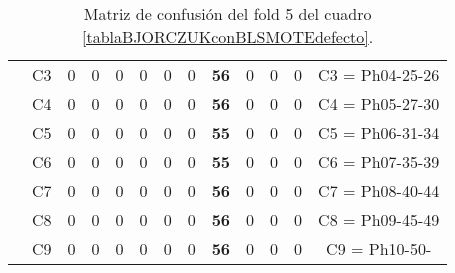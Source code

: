 \begin{table}[H]
{\begin{tabular}{|ccrrrrrrrrrrc|}
\multicolumn{1}{|c|}{}                                      & \multicolumn{1}{c|}{C3} & \multicolumn{1}{c|}{0}  & \multicolumn{1}{c|}{0}  & \multicolumn{1}{c|}{0}  & \multicolumn{1}{c|}{0}  & \multicolumn{1}{c|}{0}  & \multicolumn{1}{c|}{0}  & \multicolumn{1}{c|}{\textbf{56}} & \multicolumn{1}{c|}{0}  & \multicolumn{1}{c|}{0}  & \multicolumn{1}{c|}{0}  & C3 = Ph04-25-26   \\ \cline{2-13}
\multicolumn{1}{|c|}{}                                      & \multicolumn{1}{c|}{C4} & \multicolumn{1}{c|}{0}  & \multicolumn{1}{c|}{0}  & \multicolumn{1}{c|}{0}  & \multicolumn{1}{c|}{0}  & \multicolumn{1}{c|}{0}  & \multicolumn{1}{c|}{0}  & \multicolumn{1}{c|}{\textbf{56}} & \multicolumn{1}{c|}{0}  & \multicolumn{1}{c|}{0}  & \multicolumn{1}{c|}{0}  & C4 = Ph05-27-30   \\ \cline{2-13}
\multicolumn{1}{|c|}{}                                      & \multicolumn{1}{c|}{C5} & \multicolumn{1}{c|}{0}  & \multicolumn{1}{c|}{0}  & \multicolumn{1}{c|}{0}  & \multicolumn{1}{c|}{0}  & \multicolumn{1}{c|}{0}  & \multicolumn{1}{c|}{0}  & \multicolumn{1}{c|}{\textbf{55}} & \multicolumn{1}{c|}{0}  & \multicolumn{1}{c|}{0}  & \multicolumn{1}{c|}{0}  & C5 = Ph06-31-34   \\ \cline{2-13}
\multicolumn{1}{|c|}{}                                      & \multicolumn{1}{c|}{C6} & \multicolumn{1}{c|}{0}  & \multicolumn{1}{c|}{0}  & \multicolumn{1}{c|}{0}  & \multicolumn{1}{c|}{0}  & \multicolumn{1}{c|}{0}  & \multicolumn{1}{c|}{0}  & \multicolumn{1}{c|}{\textbf{55}} & \multicolumn{1}{c|}{0}  & \multicolumn{1}{c|}{0}  & \multicolumn{1}{c|}{0}  & C6 = Ph07-35-39   \\ \cline{2-13}
\multicolumn{1}{|c|}{}                                      & \multicolumn{1}{c|}{C7} & \multicolumn{1}{c|}{0}  & \multicolumn{1}{c|}{0}  & \multicolumn{1}{c|}{0}  & \multicolumn{1}{c|}{0}  & \multicolumn{1}{c|}{0}  & \multicolumn{1}{c|}{0}  & \multicolumn{1}{c|}{\textbf{56}} & \multicolumn{1}{c|}{0}  & \multicolumn{1}{c|}{0}  & \multicolumn{1}{c|}{0}  & C7 = Ph08-40-44   \\ \cline{2-13}
\multicolumn{1}{|c|}{}                                      & \multicolumn{1}{c|}{C8} & \multicolumn{1}{c|}{0}  & \multicolumn{1}{c|}{0}  & \multicolumn{1}{c|}{0}  & \multicolumn{1}{c|}{0}  & \multicolumn{1}{c|}{0}  & \multicolumn{1}{c|}{0}  & \multicolumn{1}{c|}{\textbf{56}} & \multicolumn{1}{c|}{0}  & \multicolumn{1}{c|}{0}  & \multicolumn{1}{c|}{0}  & C8 = Ph09-45-49   \\ \cline{2-13}
\multicolumn{1}{|c|}{}                                      & \multicolumn{1}{c|}{C9} & \multicolumn{1}{c|}{0}  & \multicolumn{1}{c|}{0}  & \multicolumn{1}{c|}{0}  & \multicolumn{1}{c|}{0}  & \multicolumn{1}{c|}{0}  & \multicolumn{1}{c|}{0}  & \multicolumn{1}{c|}{\textbf{56}} & \multicolumn{1}{c|}{0}  & \multicolumn{1}{c|}{0}  & \multicolumn{1}{c|}{0}  & C9 = Ph10-50-     \\ \hline
\end{tabular}%
}
\caption{Matriz de confusión del fold 5 del cuadro \ref{tablaBJORCZUKconBLSMOTEdefecto}.}
\end{table}

